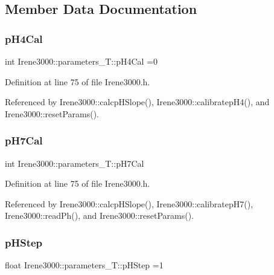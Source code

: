 \subsection{Member Data Documentation}
\mbox{\label{structIrene3000_1_1parameters__T_a1144de6fb54eb3e1dd2a3d8c2afc97dc}} 
\subsubsection{\texorpdfstring{p\+H4\+Cal}{pH4Cal}}
{\footnotesize\ttfamily int Irene3000\+::parameters\+\_\+\+T\+::p\+H4\+Cal =0}



Definition at line 75 of file Irene3000.\+h.



Referenced by Irene3000\+::calcp\+H\+Slope(), Irene3000\+::calibratep\+H4(), and Irene3000\+::reset\+Params().

\mbox{\label{structIrene3000_1_1parameters__T_a21265466a570d84bff914f26d2f7a03e}} 
\subsubsection{\texorpdfstring{p\+H7\+Cal}{pH7Cal}}
{\footnotesize\ttfamily int Irene3000\+::parameters\+\_\+\+T\+::p\+H7\+Cal}



Definition at line 75 of file Irene3000.\+h.



Referenced by Irene3000\+::calcp\+H\+Slope(), Irene3000\+::calibratep\+H7(), Irene3000\+::read\+Ph(), and Irene3000\+::reset\+Params().

\mbox{\label{structIrene3000_1_1parameters__T_a61cfcc2539d5f630e9071f3753aba9fe}} 
\subsubsection{\texorpdfstring{p\+H\+Step}{pHStep}}
{\footnotesize\ttfamily float Irene3000\+::parameters\+\_\+\+T\+::p\+H\+Step =1}



